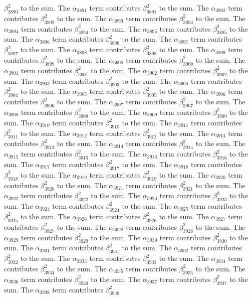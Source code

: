\begin{lemma}
$\beta_{3890}^{2}$ to the sum. The $\alpha_{3891}$ term contributes $\beta_{3891}^{2}$ to the sum. The $\alpha_{3892}$ term contributes $\beta_{3892}^{2}$ to the sum. The $\alpha_{3893}$ term contributes $\beta_{3893}^{2}$ to the sum. The $\alpha_{3894}$ term contributes $\beta_{3894}^{2}$ to the sum. The $\alpha_{3895}$ term contributes $\beta_{3895}^{2}$ to the sum. The $\alpha_{3896}$ term contributes $\beta_{3896}^{2}$ to the sum. The $\alpha_{3897}$ term contributes $\beta_{3897}^{2}$ to the sum. The $\alpha_{3898}$ term contributes $\beta_{3898}^{2}$ to the sum. The $\alpha_{3899}$ term contributes $\beta_{3899}^{2}$ to the sum. The $\alpha_{3900}$ term contributes $\beta_{3900}^{2}$ to the sum. The $\alpha_{3901}$ term contributes $\beta_{3901}^{2}$ to the sum. The $\alpha_{3902}$ term contributes $\beta_{3902}^{2}$ to the sum. The $\alpha_{3903}$ term contributes $\beta_{3903}^{2}$ to the sum. The $\alpha_{3904}$ term contributes $\beta_{3904}^{2}$ to the sum. The $\alpha_{3905}$ term contributes $\beta_{3905}^{2}$ to the sum. The $\alpha_{3906}$ term contributes $\beta_{3906}^{2}$ to the sum. The $\alpha_{3907}$ term contributes $\beta_{3907}^{2}$ to the sum. The $\alpha_{3908}$ term contributes $\beta_{3908}^{2}$ to the sum. The $\alpha_{3909}$ term contributes $\beta_{3909}^{2}$ to the sum. The $\alpha_{3910}$ term contributes $\beta_{3910}^{2}$ to the sum. The $\alpha_{3911}$ term contributes $\beta_{3911}^{2}$ to the sum. The $\alpha_{3912}$ term contributes $\beta_{3912}^{2}$ to the sum. The $\alpha_{3913}$ term contributes $\beta_{3913}^{2}$ to the sum. The $\alpha_{3914}$ term contributes $\beta_{3914}^{2}$ to the sum. The $\alpha_{3915}$ term contributes $\beta_{3915}^{2}$ to the sum. The $\alpha_{3916}$ term contributes $\beta_{3916}^{2}$ to the sum. The $\alpha_{3917}$ term contributes $\beta_{3917}^{2}$ to the sum. The $\alpha_{3918}$ term contributes $\beta_{3918}^{2}$ to the sum. The $\alpha_{3919}$ term contributes $\beta_{3919}^{2}$ to the sum. The $\alpha_{3920}$ term contributes $\beta_{3920}^{2}$ to the sum. The $\alpha_{3921}$ term contributes $\beta_{3921}^{2}$ to the sum. The $\alpha_{3922}$ term contributes $\beta_{3922}^{2}$ to the sum. The $\alpha_{3923}$ term contributes $\beta_{3923}^{2}$ to the sum. The $\alpha_{3924}$ term contributes $\beta_{3924}^{2}$ to the sum. The $\alpha_{3925}$ term contributes $\beta_{3925}^{2}$ to the sum. The $\alpha_{3926}$ term contributes $\beta_{3926}^{2}$ to the sum. The $\alpha_{3927}$ term contributes $\beta_{3927}^{2}$ to the sum. The $\alpha_{3928}$ term contributes $\beta_{3928}^{2}$ to the sum. The $\alpha_{3929}$ term contributes $\beta_{3929}^{2}$ to the sum. The $\alpha_{3930}$ term contributes $\beta_{3930}^{2}$ to the sum. The $\alpha_{3931}$ term contributes $\beta_{3931}^{2}$ to the sum. The $\alpha_{3932}$ term contributes $\beta_{3932}^{2}$ to the sum. The $\alpha_{3933}$ term contributes $\beta_{3933}^{2}$ to the sum. The $\alpha_{3934}$ term contributes $\beta_{3934}^{2}$ to the sum. The $\alpha_{3935}$ term contributes $\beta_{3935}^{2}$ to the sum. The $\alpha_{3936}$ term contributes $\beta_{3936}^{2}$ to the sum. The $\alpha_{3937}$ term contributes $\beta_{3937}^{2}$ to the sum. The $\alpha_{3938}$ term contributes $\beta_{3938}^{2}$ 
\end{lemma}

